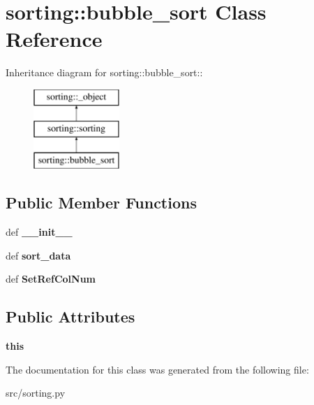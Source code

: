 \hypertarget{classsorting_1_1bubble__sort}{
\section{sorting::bubble\_\-sort Class Reference}
\label{dc/ddd/classsorting_1_1bubble__sort}
}
Inheritance diagram for sorting::bubble\_\-sort::\begin{figure}[H]
\begin{center}
\leavevmode
\includegraphics[height=3cm]{dc/ddd/classsorting_1_1bubble__sort}
\end{center}
\end{figure}
\subsection*{Public Member Functions}
\begin{DoxyCompactItemize}
\item 
\hypertarget{classsorting_1_1bubble__sort_a41429408d3f230ce2b68acaeacabe719}{
def {\bfseries \_\-\_\-init\_\-\_\-}}
\label{dc/ddd/classsorting_1_1bubble__sort_a41429408d3f230ce2b68acaeacabe719}

\item 
\hypertarget{classsorting_1_1bubble__sort_a25f3566a6fe7dac1291ae1ca3b190f6d}{
def {\bfseries sort\_\-data}}
\label{dc/ddd/classsorting_1_1bubble__sort_a25f3566a6fe7dac1291ae1ca3b190f6d}

\item 
\hypertarget{classsorting_1_1bubble__sort_aa4d91cd959905d26975604a165687d6e}{
def {\bfseries SetRefColNum}}
\label{dc/ddd/classsorting_1_1bubble__sort_aa4d91cd959905d26975604a165687d6e}

\end{DoxyCompactItemize}
\subsection*{Public Attributes}
\begin{DoxyCompactItemize}
\item 
\hypertarget{classsorting_1_1bubble__sort_ad9ac15e871f8737d8513e7ee1097c5e4}{
{\bfseries this}}
\label{dc/ddd/classsorting_1_1bubble__sort_ad9ac15e871f8737d8513e7ee1097c5e4}

\end{DoxyCompactItemize}


The documentation for this class was generated from the following file:\begin{DoxyCompactItemize}
\item 
src/sorting.py\end{DoxyCompactItemize}
